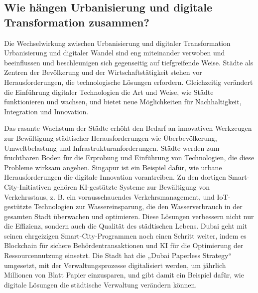 \documentclass[conference,compsoc,final,a4paper, onecolumn, 11pt]{IEEEtran}
\begin{document}
\subsection{Wie hängen Urbanisierung und digitale Transformation zusammen?}
Die Wechselwirkung zwischen Urbanisierung und digitaler Transformation
Urbanisierung und digitaler Wandel sind eng miteinander verwoben und beeinflussen und beschleunigen sich gegenseitig auf tiefgreifende Weise. 
Städte als Zentren der Bevölkerung und der Wirtschaftstätigkeit stehen vor Herausforderungen, die technologische Lösungen erfordern. 
Gleichzeitig verändert die Einführung digitaler Technologien die Art und Weise, wie Städte funktionieren und wachsen, und bietet neue Möglichkeiten für Nachhaltigkeit, Integration und Innovation. \autocite{European_commission2019-al}

Das rasante Wachstum der Städte erhöht den Bedarf an innovativen Werkzeugen zur Bewältigung städtischer Herausforderungen wie Überbevölkerung, Umweltbelastung und Infrastrukturanforderungen. 
Städte werden zum fruchtbaren Boden für die Erprobung und Einführung von Technologien, die diese Probleme wirksam angehen. 
Singapur ist ein Beispiel dafür, wie urbane Herausforderungen die digitale Innovation vorantreiben. 
Zu den dortigen Smart-City-Initiativen gehören \ac{KI}-gestützte Systeme zur Bewältigung von Verkehrsstaus, z. B. 
ein vorausschauendes Verkehrsmanagement, und \ac{IoT}-gestützte Technologien zur Wassereinsparung, die den Wasserverbrauch in der gesamten Stadt überwachen und optimieren. 
Diese Lösungen verbessern nicht nur die Effizienz, sondern auch die Qualität des städtischen Lebens. \autocite{noauthor_undated-xa}
Dubai geht mit seinen ehrgeizigen Smart-City-Programmen noch einen Schritt weiter, indem es Blockchain für sichere Behördentransaktionen und \ac{KI} für die Optimierung der Ressourcennutzung einsetzt. 
Die Stadt hat die „Dubai Paperless Strategy“ umgesetzt, mit der Verwaltungsprozesse digitalisiert werden, um jährlich Millionen von Blatt Papier einzusparen, und gibt damit ein Beispiel dafür, wie digitale Lösungen die städtische Verwaltung verändern können. \autocite{noauthor_undated-gl}
\end{document}
